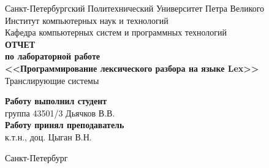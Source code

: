 \begin{titlepage}
\begin{center}
	Санкт-Петербургский Политехнический Университет Петра Великого\\[0.3cm]
	Институт компьютерных наук и технологий \\[0.3cm]
	Кафедра компьютерных систем и программных технологий\\[4cm]
	
	\textbf{ОТЧЕТ}\\ 
	\textbf{по лабораторной работе}\\[0.5cm]
	\textbf{<<Программирование лексического разбора на языке Lex>>}\\[0.1cm]
	Транслирующие системы\\[3.0cm]
\end{center}

\begin{flushright}
	\begin{minipage}{0.45\textwidth}
		\textbf{Работу выполнил студент}\\[3mm]
		группа 43501/3 \hfill Дьячков В.В.\\[5mm]
		\textbf{Работу принял преподаватель}\\[5mm]
		\sign[2cm] \hfill к.т.н., доц. Цыган В.Н. \\[5mm]
	\end{minipage}
\end{flushright}

\vfill

\begin{center}
	Санкт-Петербург\\[0.3cm]
	\the\year
\end{center}
\end{titlepage}

\addtocounter{page}{1}